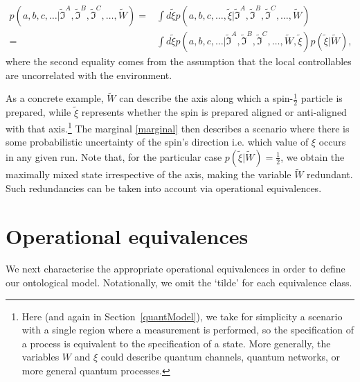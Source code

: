\documentclass[a4paper,onecolumn,11pt,accepted=2018-05-04]{quantumarticle}
\begin{document}
\begin{align}\label{marginal}
p(a, b, c,\dots| \tilde{\mathcal{\mathfrak{I}}}^A, \tilde{\mathcal{\mathfrak{I}}}^B, \tilde{\mathcal{\mathfrak{I}}}^C,\dots, \tilde{W}) =& \int d\tilde{\xi} p(a, b, c,\dots, \tilde{\xi}| \tilde{\mathcal{\mathfrak{I}}}^A, \tilde{\mathcal{\mathfrak{I}}}^B, \tilde{\mathcal{\mathfrak{I}}}^C,\dots, \tilde{W})\\ \nonumber
=& \int d\tilde{\xi} p(a, b, c,\dots| \tilde{\mathcal{\mathfrak{I}}}^A, \tilde{\mathcal{\mathfrak{I}}}^B, \tilde{\mathcal{\mathfrak{I}}}^C,\dots, \tilde{W},\tilde{\xi}) p( \tilde{\xi}| \tilde{W}),
\end{align}
where the second equality comes from the assumption that the local controllables are uncorrelated with the environment. 

As a concrete example, $\tilde{W}$ can describe the axis along which a spin-$\frac{1}{2}$ particle is prepared, while $\tilde{\xi}$ represents whether the spin is prepared aligned or anti-aligned with that axis.\footnote{Here (and again in Section~\ref{quantModel}), we take for simplicity a scenario with a single region where a measurement is performed, so the specification of a process is equivalent to the specification of a state. More generally, the variables $W$ and $\xi$ could describe quantum channels, quantum networks, or more general quantum processes.} The marginal \eqref{marginal} then describes a scenario where there is some probabilistic uncertainty of the spin's direction i.e. which value of $\xi$ occurs in any given run. Note that, for the particular case $p( \tilde{\xi}| \tilde{W})=\frac{1}{2}$, we obtain the maximally mixed state irrespective of the axis, making the variable $\tilde{W}$ redundant. Such redundancies can be taken into account via operational equivalences. 


\section{Operational equivalences}\label{opEquiv}
We next characterise the appropriate operational equivalences in order to define our ontological model. Notationally, we omit the `tilde' for each equivalence class.
\end{document}
